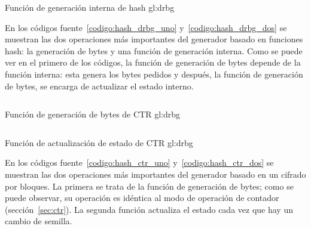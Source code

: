 \begin{listing}
  \inputminted[firstline=166, lastline=186]
    {c++}{../implementaciones/drbg/hash_drbg.cpp}
  \caption{Función de generación interna de hash \gls{gl:drbg}}
  \label{codigo:hash_drbg_dos}
\end{listing}

En los códigos fuente~\ref{codigo:hash_drbg_uno} y~\ref{codigo:hash_drbg_dos}
se muestran las dos operaciones más importantes del generador basado en
funciones hash: la generación de bytes y una función de generación interna.
Como se puede ver en el primero de los códigos, la función de generación de
bytes depende de la función interna: esta genera los bytes pedidos y después,
la función de generación de bytes, se encarga de actualizar el estado interno.

\begin{listing}
  \inputminted[firstline=82, lastline=101]
    {c++}{../implementaciones/drbg/ctr_drbg.cpp}
  \caption{Función de generación de bytes de CTR \gls{gl:drbg}}
  \label{codigo:hash_ctr_uno}
\end{listing}

\begin{listing}
  \inputminted[firstline=103, lastline=123]
    {c++}{../implementaciones/drbg/ctr_drbg.cpp}
  \caption{Función de actualización de estado de CTR \gls{gl:drbg}}
  \label{codigo:hash_ctr_dos}
\end{listing}

En los códigos fuente~\ref{codigo:hash_ctr_uno} y~\ref{codigo:hash_ctr_dos}
se muestran las dos operaciones más importantes del generador basado en un
cifrado por bloques. La primera se trata de la función de generación de bytes;
como se puede observar, su operación es idéntica al modo de operación de
contador (sección~\ref{sec:ctr}). La segunda función actualiza el estado
cada vez que hay un cambio de semilla.
